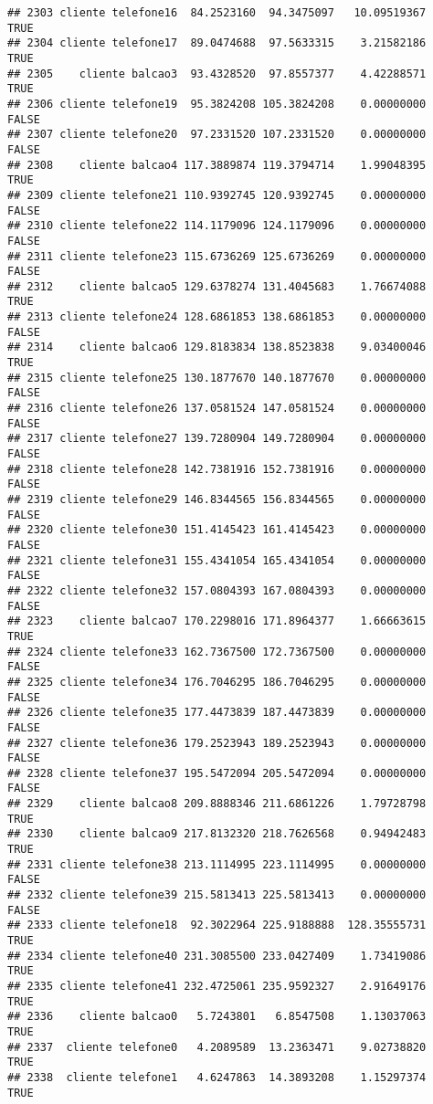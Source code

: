 \documentclass[
]{article}
\begin{document}
\begin{verbatim}
## 2303 cliente telefone16  84.2523160  94.3475097   10.09519367     TRUE
## 2304 cliente telefone17  89.0474688  97.5633315    3.21582186     TRUE
## 2305    cliente balcao3  93.4328520  97.8557377    4.42288571     TRUE
## 2306 cliente telefone19  95.3824208 105.3824208    0.00000000    FALSE
## 2307 cliente telefone20  97.2331520 107.2331520    0.00000000    FALSE
## 2308    cliente balcao4 117.3889874 119.3794714    1.99048395     TRUE
## 2309 cliente telefone21 110.9392745 120.9392745    0.00000000    FALSE
## 2310 cliente telefone22 114.1179096 124.1179096    0.00000000    FALSE
## 2311 cliente telefone23 115.6736269 125.6736269    0.00000000    FALSE
## 2312    cliente balcao5 129.6378274 131.4045683    1.76674088     TRUE
## 2313 cliente telefone24 128.6861853 138.6861853    0.00000000    FALSE
## 2314    cliente balcao6 129.8183834 138.8523838    9.03400046     TRUE
## 2315 cliente telefone25 130.1877670 140.1877670    0.00000000    FALSE
## 2316 cliente telefone26 137.0581524 147.0581524    0.00000000    FALSE
## 2317 cliente telefone27 139.7280904 149.7280904    0.00000000    FALSE
## 2318 cliente telefone28 142.7381916 152.7381916    0.00000000    FALSE
## 2319 cliente telefone29 146.8344565 156.8344565    0.00000000    FALSE
## 2320 cliente telefone30 151.4145423 161.4145423    0.00000000    FALSE
## 2321 cliente telefone31 155.4341054 165.4341054    0.00000000    FALSE
## 2322 cliente telefone32 157.0804393 167.0804393    0.00000000    FALSE
## 2323    cliente balcao7 170.2298016 171.8964377    1.66663615     TRUE
## 2324 cliente telefone33 162.7367500 172.7367500    0.00000000    FALSE
## 2325 cliente telefone34 176.7046295 186.7046295    0.00000000    FALSE
## 2326 cliente telefone35 177.4473839 187.4473839    0.00000000    FALSE
## 2327 cliente telefone36 179.2523943 189.2523943    0.00000000    FALSE
## 2328 cliente telefone37 195.5472094 205.5472094    0.00000000    FALSE
## 2329    cliente balcao8 209.8888346 211.6861226    1.79728798     TRUE
## 2330    cliente balcao9 217.8132320 218.7626568    0.94942483     TRUE
## 2331 cliente telefone38 213.1114995 223.1114995    0.00000000    FALSE
## 2332 cliente telefone39 215.5813413 225.5813413    0.00000000    FALSE
## 2333 cliente telefone18  92.3022964 225.9188888  128.35555731     TRUE
## 2334 cliente telefone40 231.3085500 233.0427409    1.73419086     TRUE
## 2335 cliente telefone41 232.4725061 235.9592327    2.91649176     TRUE
## 2336    cliente balcao0   5.7243801   6.8547508    1.13037063     TRUE
## 2337  cliente telefone0   4.2089589  13.2363471    9.02738820     TRUE
## 2338  cliente telefone1   4.6247863  14.3893208    1.15297374     TRUE

\end{verbatim}
\end{document}

